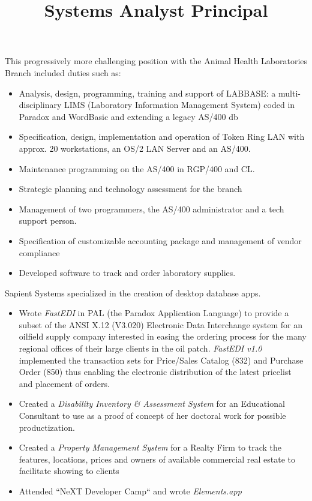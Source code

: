 \documentclass[line,margin]{res}
\begin{document}
\begin{resume}
\begin{position}
\end{position}



\title{Systems Analyst}
\begin{position}
This progressively more challenging position with the Animal Health
Laboratories Branch included duties such as:
\begin{itemize}
\item Analysis, design, programming, training and support of LABBASE: 
        a multi-disciplinary LIMS (Laboratory Information Management System)  
	coded in Paradox and WordBasic and extending a legacy AS/400 db
\item Specification, design, implementation and operation of Token Ring LAN 
	with approx. 20 workstations, an OS/2 LAN Server and an AS/400.  
\item Maintenance programming on the AS/400 in RGP/400 and CL.  
\item Strategic planning and technology assessment for the branch 
\item Management of two programmers, the AS/400 administrator and a
	 tech support person.
\item Specification of customizable accounting package and management of 
         vendor compliance
\item Developed software to track and order laboratory supplies.
\end{itemize}
\end{position}


\title{ Principal }
\begin{position}
Sapient Systems specialized in the creation of desktop database apps.
\begin{itemize}
\item Wrote {\it FastEDI} in PAL (the Paradox Application Language)  to 
	provide a subset of the 
	ANSI X.12 (V3.020) Electronic Data Interchange system for an 
	oilfield supply company interested in easing the ordering process for
	the many regional offices of their large clients in the oil patch.  
	{\it FastEDI v1.0} implemented 
	the transaction sets for Price/Sales Catalog (832) and
	Purchase Order (850) thus enabling the electronic distribution 
	of the latest pricelist and placement of orders.
\item Created a {\it Disability Inventory \& Assessment System }
	for an Educational Consultant to use as a proof of concept of
	her doctoral work for possible productization.
\item Created a {\it Property Management System} for a Realty Firm to
	track the features, locations, prices and owners of 
	available commercial real estate to facilitate showing to clients
\item Attended ``NeXT Developer Camp`` and wrote \emph{Elements.app}
\end{itemize}
\end{position}



\end{resume}
\end{document}
